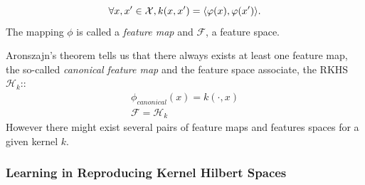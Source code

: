 \begin{Proposition}
\begin{proposition}
    \begin{equation}
    \forall x, x' \in \mathcal{X}, k(x,x')=\langle\varphi(x),\varphi(x')\rangle.
    \end{equation}
    The mapping $\phi$ is called a {\it feature map} and $\mathcal{F}$, a feature space.
    \end{proposition}
    \begin{remark}
    Aronszajn's theorem tells us that there always exists at least one feature map, the so-called {\it canonical feature map} and the feature space associate, the \acl{RKHS} $\mathcal{H}_k$:: 
    \begin{eqnarray*}
    \phi_{canonical}(x)= k(\cdot, x)\\
    \mathcal{F}= \mathcal{H}_k
    \end{eqnarray*}
    However there might exist several pairs of feature maps and features spaces for a given kernel $k$.
    \end{remark}
    
 \subsubsection{Learning in Reproducing Kernel Hilbert Spaces}


\end{Proposition}
